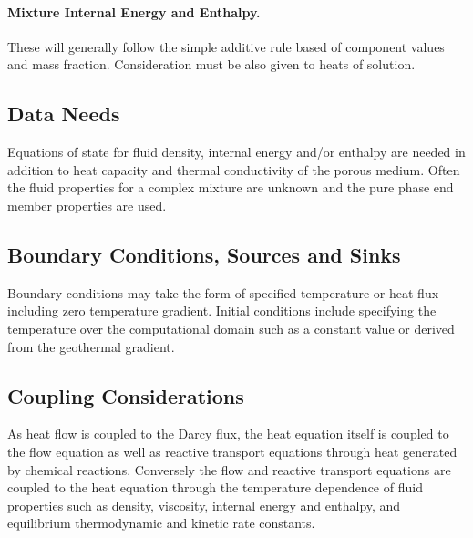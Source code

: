 \paragraph{Mixture Internal Energy and Enthalpy.} 

These will generally follow the simple additive rule based of
component values and mass fraction. Consideration must be also given
to heats of solution.


\subsection{Data Needs}

Equations of state for fluid density, internal energy and/or enthalpy are needed 
in addition to heat capacity and thermal conductivity of the porous medium. 
Often the fluid properties for a complex mixture are unknown and the pure phase end member properties are used. 

\subsection{Boundary Conditions, Sources and Sinks}

Boundary conditions may take the form of specified temperature or heat flux including zero temperature gradient. 
Initial conditions include specifying the temperature over the computational domain 
such as a constant value or derived from the geothermal gradient.

\subsection{Coupling Considerations}

As heat flow is coupled to the Darcy flux, the heat equation itself is coupled to the flow equation 
as well as reactive transport equations through heat generated by chemical reactions. 
Conversely the flow and reactive transport equations are coupled to the heat equation 
through the temperature dependence of fluid properties such as density, viscosity, internal energy and enthalpy, 
and equilibrium thermodynamic and kinetic rate constants.

